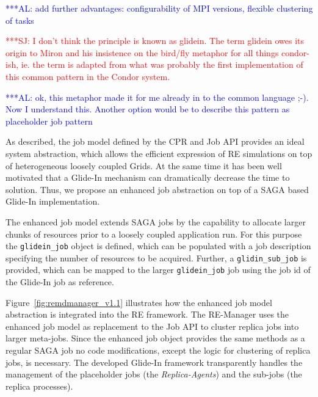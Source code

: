 \documentclass{rspublic}
\newcommand{\alnote}[1]{ {\textcolor{blue} { ***AL: #1 }}}
\newcommand{\jhanote}[1]{ {\textcolor{red} { ***SJ: #1 }}}
\newcommand{\alnote}[1]{}
\newcommand{\jhanote}[1]{}
\newcommand{\glidein}[1]{Glide-In }
\newcommand{\remanager}[1]{RE-Manager }
\begin{document}
\alnote{add further advantages: configurability of MPI versions, flexible clustering of tasks}

\jhanote{I
don't think the principle is known as glidein. The term glidein owes
its origin to Miron and his insistence on the bird/fly metaphor for
all things condor-ish, ie. the term is adapted from what was
probably the first implementation of this common pattern in the
Condor system.}             

\alnote{ok, this metaphor made it for me already in to the common language 
;-). Now I understand this. Another option would 
be to describe this pattern as 
placeholder job pattern}

As described, the job model defined by the CPR and Job API provides an ideal 
system abstraction, which allows the efficient expression of RE simulations on
top of heterogeneous loosely coupled Grids. At the same time it has been well motivated
that a \glidein\ mechanism can dramatically decrease the time to solution. Thus, we
propose an enhanced job abstraction on top of a SAGA based \glidein\ implementation.

The enhanced job model extends SAGA jobs by the
capability to allocate larger chunks of resources prior to a loosely
coupled application run. For this purpose the \texttt{glidein\_job} object is defined, which
can be populated with a job description specifying the number of resources to be acquired.
Further, a \texttt{glidin\_sub\_job} is provided, which can be mapped
to the larger \texttt{glidein\_job} job using the job id of the \glidein\ job as reference.

Figure~\ref{fig:remdmanager_v1.1} illustrates how the enhanced job model abstraction is integrated
into the RE framework. The \remanager\  uses the enhanced job model as replacement to the Job API
to  cluster replica jobs into larger meta-jobs. Since the enhanced job object provides the same methods
as a regular SAGA job  no code modifications, except the logic for clustering of replica jobs, 
is necessary. The developed \glidein\ framework transparently handles the management of the placeholder jobs
(the \textit{Replica-Agents}) and the sub-jobs (the replica processes). 
\end{document}
